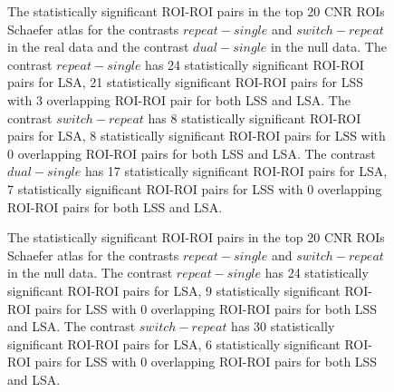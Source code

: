 \documentclass[10pt,letterpaper]{article}
\begin{document}
\begin{figure}[H]
    \ContinuedFloat
    \centering



    \caption{
        The statistically significant ROI-ROI pairs in the top 20 CNR ROIs Schaefer atlas
        for the contrasts $repeat - single$ and $switch - repeat$ in the real data and
        the contrast $dual - single$ in the null data.
        The contrast $repeat - single$ has 24 statistically significant ROI-ROI
        pairs for LSA, 21 statistically significant ROI-ROI pairs
        for LSS with 3 overlapping ROI-ROI pair for both LSS and LSA.
        The contrast $switch - repeat$ has 8 statistically significant ROI-ROI
        pairs for LSA, 8 statistically significant ROI-ROI pairs
        for LSS with 0 overlapping ROI-ROI pairs for both LSS and LSA.
        The contrast $dual - single$ has 17 statistically significant ROI-ROI
        pairs for LSA, 7 statistically significant ROI-ROI pairs
        for LSS with 0 overlapping ROI-ROI pairs for both LSS and LSA.
    }
    \label{fig:significant-contrasts}
\end{figure}

\begin{figure}[H]
    \ContinuedFloat
    \centering


    \caption{
        The statistically significant ROI-ROI pairs in the top 20 CNR ROIs Schaefer atlas
        for the contrasts $repeat - single$ and $switch - repeat$ in the null data.
        The contrast $repeat - single$ has 24 statistically significant ROI-ROI
        pairs for LSA, 9 statistically significant ROI-ROI pairs
        for LSS with 0 overlapping ROI-ROI pairs for both LSS and LSA.
        The contrast $switch - repeat$ has 30 statistically significant ROI-ROI
        pairs for LSA, 6 statistically significant ROI-ROI pairs
        for LSS with 0 overlapping ROI-ROI pairs for both LSS and LSA.
    }
    \label{fig:significant-contrasts}
\end{figure}
\end{document}
